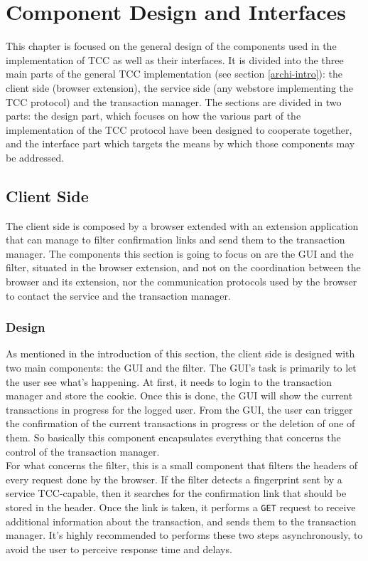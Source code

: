 \chapter{Component Design and Interfaces}
\label{component-design}

This chapter is focused on the general design of the components used in the implementation of TCC as well as their interfaces. It is divided into the three main parts of the general TCC implementation (see section \ref{archi-intro}): the client side (browser extension), the service side (any webstore implementing the TCC protocol) and the transaction manager. The sections are divided in two parts: the design part, which focuses on how the various part of the implementation of the TCC protocol have been designed to cooperate together, and the interface part which targets the means by which those components may be addressed.\\

\section{Client Side}
The client side is composed by a browser extended with an extension application that can manage to filter confirmation links and send them to the transaction manager. The components this section is going to focus on are the GUI and the filter, situated in the browser extension, and not on the coordination between the browser and its extension, nor the communication protocols used by the browser to contact the service and the transaction manager.

\subsection{Design}
\label{tcc-client-side-design}
As mentioned in the introduction of this section, the client side is designed with two main components: the GUI and the filter. The GUI's task is primarily to let the user see what's happening. At first, it needs to login to the transaction manager and store the cookie. Once this is done, the GUI will show the current transactions in progress for the logged user. From the GUI, the user can trigger the confirmation of the current transactions in progress or the deletion of one of them. So basically this component encapsulates everything that concerns the control of the transaction manager.\\
For what concerns the filter, this is a small component that filters the headers of every request done by the browser. If the filter detects a fingerprint sent by a service TCC-capable, then it searches for the confirmation link that should be stored in the header. Once the link is taken, it performs a {\tt GET} request to receive additional information about the transaction, and sends them to the transaction manager. It's highly recommended to performs these two steps asynchronously, to avoid the user to perceive response time and delays.


